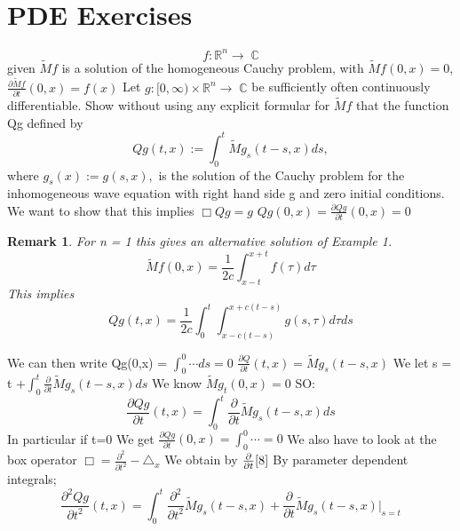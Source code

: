 \documentclass[12pt, oneside, a4paper]{article}
\theoremstyle{dfn}
\newtheorem{rem}[thm]{Remark}
\def\Rbb{\ensuremath{\mathbb{R}}}
\newcommand{\To}{\ensuremath{\rightarrow \;}}
\newcommand{\Com}{\mathbb{C}}
\begin{document}
\section{PDE Exercises}
\begin{equation*}
 f: \Rbb^n \To \Com
\end{equation*}
given
$\tilde{M}f$ is a solution of the homogeneous Cauchy problem, with $\tilde{M}f(0,x) = 0$,
$\frac{\partial \tilde{M}f}{\partial t}(0,x) = f(x)$
Let $g:[0,\infty) \times \Rbb^n \To \Com$ be sufficiently often continuously differentiable. Show without using any
explicit formular for $\tilde{M}f$ that the function Qg defined by 
\begin{equation*}
 Qg(t,x):= \int^{t}_{0} \tilde{M}g_s(t-s,x)ds, 
\end{equation*}
where $g_s(x):= g(s,x),$ is the solution of the Cauchy problem for the inhomogeneous wave equation with right hand
side g and zero initial conditions. 
We want to show that this implies $\Box Qg = g$
$Qg(0,x)= \frac{\partial Qg}{\partial t}(0,x) = 0$
\newline
\begin{rem}
 For n = 1 this gives an alternative solution of Example 1.
\begin{equation*}
 \tilde{M}f(0,x) = \frac{1}{2c} \int^{x+t}_{x-t}f(\tau)d\tau
\end{equation*}
This implies 
\begin{equation}
 Qg(t,x) = \frac{1}{2c} \int^{t}_{0} \int^{x+c(t-s)}_{x-c(t-s)}g(s,\tau)d\tau ds
\end{equation}

\end{rem}
We can then write Qg(0,x) = $\int_0^0 \cdots ds = 0$
$\frac{\partial Q}{\partial t}(t,x) = \tilde{M} g_s(t-s,x)$ 
We let s = t 
$+\int^t_0 \frac{\partial}{\partial t} \tilde{M}g_s(t-s,x)ds$
We know $\tilde{M}g_t(0,x) =0$
SO: \begin{equation}\label{8}
     \frac{\partial Qg}{\partial t}(t,x) = \int^{t}_0 \frac{\partial}{\partial t} \tilde{M}g_s(t-s,x)ds 
    \end{equation}
In particular if t=0 
We get $\frac{\partial Qg}{\partial t} (0,x) = \int^0_0 \cdots = 0$
We also have to look at the box operator 
$\Box = \frac{\partial^2}{\partial t^2} - \triangle_x$
We obtain by $\frac{\partial}{\partial t}\ref{8}$
By parameter dependent integrals;
\begin{equation*}
 \frac{\partial^2 Qg}{\partial t^2}(t,x) = \int^{t}_0 \frac{\partial^2}{\partial t^2} \tilde{M}g_s(t-s,x) + 
\frac{\partial}{\partial t} \tilde{M}g_s (t-s,x)|_{s=t} 
\end{equation*}
\end{document}
